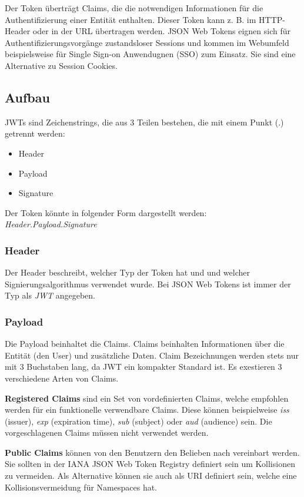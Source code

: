 Der Token überträgt Claims, die die notwendigen Informationen für die Authentifizierung einer Entität enthalten. 
Dieser Token kann z. B. im HTTP-Header oder in der URL übertragen werden. JSON Web Tokens eignen sich für Authentifizierungsvorgänge zustandsloser Sessions und kommen 
im Webumfeld beispielsweise für Single Sign-on Anwendugnen (SSO) zum Einsatz. Sie sind eine Alternative zu Session Cookies. 

\subsection{Aufbau}
JWTs sind Zeichenstrings, die aus 3 Teilen bestehen, die mit einem Punkt (.) getrennt werden:
\begin{itemize}
    \item Header
    \item Payload
    \item Signature
\end{itemize}
Der Token könnte in folgender Form dargestellt werden: \textit{Header.Payload.Signature}

\subsubsection{Header}
Der Header beschreibt, welcher Typ der Token hat und und welcher Signierungsalgorithmus verwendet wurde. 
Bei JSON Web Tokens ist immer der Typ als \textit{JWT} angegeben.

\subsubsection{Payload}
Die Payload beinhaltet die Claims. Claims beinhalten Informationen über die Entität (den User) und zusätzliche Daten. 
Claim Bezeichnungen werden stets nur mit 3 Buchstaben lang, da JWT ein kompakter Standard ist. Es exestieren 3 verschiedene Arten von Claims. 

\textbf{Registered Claims} sind ein Set von vordefinierten Claims, welche empfohlen werden für ein funktionelle verwendbare Claims. 
Diese können beispielweise \textit{iss} (issuer), \textit{exp} (expiration time), \textit{sub} (subject) oder \textit{aud} (audience) sein. 
Die vorgeschlagenen Claims müssen nicht verwendet werden. 

\textbf{Public Claims} können von den Benutzern den Belieben nach vereinbart werden. Sie sollten in der 
IANA JSON Web Token Registry definiert sein um Kollisionen zu vermeiden. Als Alternative können sie auch als URI definiert sein, welche eine Kollisionsvermeidung für Namespaces hat.

